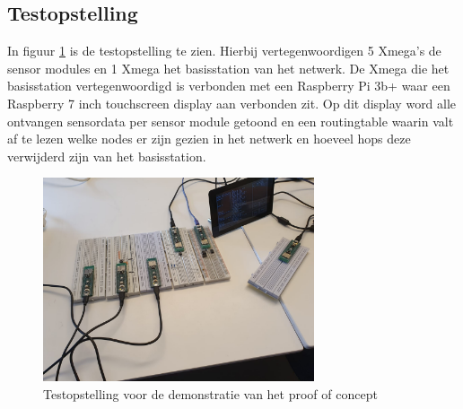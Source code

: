 \documentclass[a4paper, 11pt]{article}
\begin{document}
\subsection{Testopstelling} \label{Testopstelling}
In figuur \ref{testopstelling} is de testopstelling te zien. Hierbij vertegenwoordigen 5 Xmega's de sensor modules en 1 Xmega het basisstation van het netwerk. De Xmega die het basisstation vertegenwoordigd is verbonden met een Raspberry Pi 3b+  waar een Raspberry 7 inch touchscreen display aan verbonden zit. Op dit display word alle ontvangen sensordata per sensor module getoond en een routingtable waarin valt af te lezen welke nodes er zijn gezien in het netwerk en hoeveel hops deze verwijderd zijn van het basisstation.
\begin{figure}[h!]
	\centering
	\includegraphics[width=8cm]{media/testOpstellingNetwerk.jpeg}
	\caption{Testopstelling voor de demonstratie van het proof of concept} \label{testopstelling}
\end{figure}

\newpage
\end{document}
